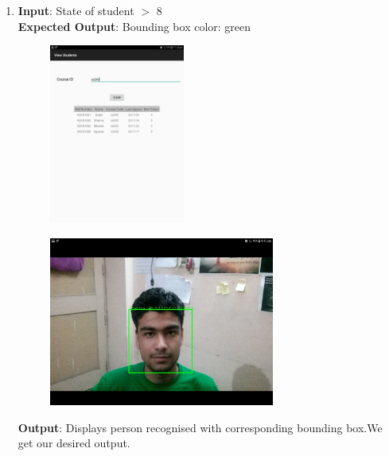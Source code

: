 \documentclass{scrreprt}
\begin{document}
\begin{itemize}
\begin{enumerate}
\item \textbf{Input}: State of student $>$ 8\\
\textbf{Expected Output}: Bounding box color: green
\begin{figure}[H]
\centering
\includegraphics[width=0.42\textwidth, keepaspectratio]{camgr.jpg}
\end{figure}
\begin{figure}[H]
\centering
\includegraphics[width=0.7\textwidth, keepaspectratio]{camgrdone.jpg}
\end{figure}
\textbf{Output}: Displays person recognised with corresponding bounding box.We get our desired output.


\end{enumerate}
\end{itemize}
\end{document}
